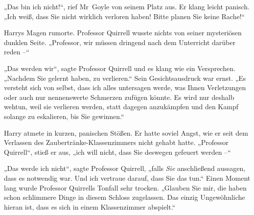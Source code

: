 „Das bin ich nicht!“, rief Mr~Goyle von seinem Platz aus. Er klang leicht panisch. „Ich weiß, dass Sie nicht wirklich verloren haben! Bitte planen Sie keine Rache!“

Harrys Magen rumorte. Professor Quirrell wusste nichts von seiner mysteriösen dunklen Seite. „Professor, wir müssen dringend nach dem Unterricht darüber reden –“

„Das werden wir“, sagte Professor Quirrell und es klang wie ein Versprechen. „Nachdem Sie gelernt haben, zu verlieren.“ Sein Gesichtsausdruck war ernst. „Es versteht sich von selbst, dass ich alles untersagen werde, was Ihnen Verletzungen oder auch nur nennenswerte Schmerzen zufügen könnte. Es wird nur deshalb wehtun, weil sie verlieren werden, statt dagegen anzukämpfen und den Kampf solange zu eskalieren, bis Sie gewinnen.“

Harry atmete in kurzen, panischen Stößen. Er hatte soviel Angst, wie er seit dem Verlassen des Zaubertränke-Klassenzimmers nicht gehabt hatte. „Professor Quirrell“, stieß er aus, „ich will nicht, dass Sie deswegen gefeuert werden –“

„Das werde ich nicht“, sagte Professor Quirrell, „falls \emph{Sie} anschließend aussagen, dass es notwendig war. Und ich vertraue darauf, dass Sie das tun.“ Einen Moment lang wurde Professor Quirrells Tonfall sehr trocken. „Glauben Sie mir, die haben schon schlimmere Dinge in diesem Schloss zugelassen. Das einzig Ungewöhnliche hieran ist, dass es sich in einem Klassenzimmer abspielt.“

